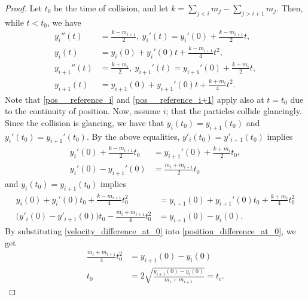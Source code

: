 \documentclass[10pt,a4paper]{amsart}
\begin{document}
        \begin{proof}
            Let $t_0$ be the time of collision, and let $k = \sum_{j < i}{m_j} - \sum_{j > i + 1}{m_j}$. Then, while $t < t_0$, we have 
            \begin{align}
                y_i''(t) &= \frac{k - m_{i+1}}{2}, \ 
                y_i'(t) = y_i'(0) + \frac{k - m_{i+1}}{2} t, \label{vel__reference_i}\\
                y_i(t) &= y_i(0) + y_i'(0)t + \frac{k - m_{i+1}}{4} t^2, \label{pos__reference_i}\\
                y_{i+1}''(t) &= \frac{k + m_{i}}{2},\ 
                y_{i+1}'(t) = y_{i+1}'(0) + \frac{k + m_{i}}{2} t, \label{vel__reference_i+1}\\
                y_{i+1}(t) &= y_{i+1}(0) + y_{i+1}'(0) t + \frac{k + m_{i}}{4} t^2. \label{pos__reference_i+1}
            \end{align}
            Note that \eqref{pos__reference_i} and \eqref{pos__reference_i+1} apply also at $t=t_0$ due to the continuity of position. Now, assume $i$; that the particles collide glancingly. Since the collision is glancing, we have that $y_i(t_0) = y_{i+1}(t_0)$ and $y_i'(t_0) = y_{i+1}'(t_0)$. By the above equalities, $y'_i(t_0) = y'_{i+1}(t_0)$ implies
            \begin{align}
                y_i'(0) + \frac{k - m_{i+1}}{2} t_0 &= y_{i+1}'(0) + \frac{k + m_{i}}{2} t_0,\nonumber \\
                y_i'(0) - y_{i+1}'(0) &= \frac{m_i + m_{i+1}}{2} t_0 \label{velocity_difference_at_0}
            \end{align}
            and $y_i(t_0) = y_{i+1}(t_0)$ implies
            \begin{align}
                y_i(0) + y_i'(0)t_0 + \frac{k - m_{i+1}}{4} t_0^2 &= y_{i+1}(0) + y_{i+1}'(0)t_0 + \frac{k + m_{i}}{4} t_0^2 \nonumber\\
                \big( y'_i(0) - y'_{i+1}(0) \big) t_0 - \frac{m_i + m_{i+1}}{4}t_0^2 &= y_{i+1}(0) - y_i(0). \label{position_difference_at_0}
            \end{align}
            By substituting \eqref{velocity_difference_at_0} into \eqref{position_difference_at_0}, we get
            \begin{align*}
                \frac{m_i + m_{i+1}}{4}t_0^2 &= y_{i+1}(0) - y_i(0) 
                \\
                t_0 &= 2\sqrt{\frac{y_{i+1}(0) - y_i(0)}{m_i + m_{i+1}}} = t_c.
            \end{align*}

\end{proof}
\end{document}
